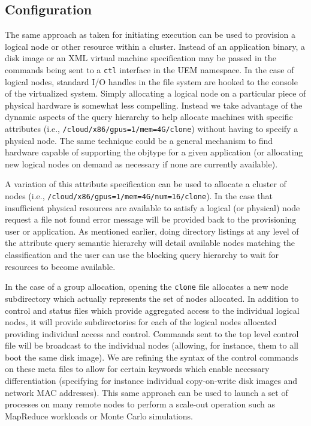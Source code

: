 \documentclass{sig-alternate}
\begin{document}
\subsection{Configuration}
The same approach as taken for initiating execution can be used to provision a logical node or 
other resource within a cluster.  Instead of an application binary, a disk
image or an XML virtual machine specification may be passed in the commands being sent to
a {\tt ctl} interface in the UEM namespace.  In the case of logical nodes, standard I/O handles in the file
system are hooked to the console of the virtualized system.
Simply allocating a logical node on a particular piece of physical hardware
is somewhat less compelling.
Instead we take advantage of the dynamic aspects of the 
query hierarchy to help allocate machines with specific
attributes (i.e., {\tt /cloud/x86/gpus=1/mem=4G/clone}) without having to specify
a physical node.  The same technique could be a general mechanism to find 
hardware capable of supporting the objtype for a given application 
(or allocating new logical nodes on demand as necessary if none are currently
available).

A variation of this attribute specification can be used to allocate
a cluster of nodes (i.e., {\tt /cloud/x86/gpus=1/mem=4G/num=16/clone}).
In the case that insufficient physical resources are available to 
satisfy a logical (or physical) node request a file not found error 
message will be provided back to the provisioning user or application.
As mentioned earlier, doing directory listings at any level of the attribute 
query semantic hierarchy will detail available nodes matching the 
classification and the user can use the blocking query hierarchy to wait
for resources to become available. 

In the case of a group allocation, opening the {\tt clone} file allocates 
a new node subdirectory which actually represents the set of nodes 
allocated.  In addition to
control and status files which provide aggregated access to the individual
logical nodes, it will provide subdirectories for each of the logical 
nodes allocated providing individual access and control.  Commands sent to 
the top level control file will be broadcast to the individual nodes 
(allowing, for instance, them to all boot the same disk image).  
We are refining the syntax of the control 
commands on these meta files to allow for certain
keywords which enable necessary differentiation (specifying for instance
individual copy-on-write disk images and network MAC addresses).
This same approach can be used to launch a set of processes on many remote
nodes to perform a scale-out operation such as MapReduce workloads or
Monte Carlo simulations.
\end{document}
